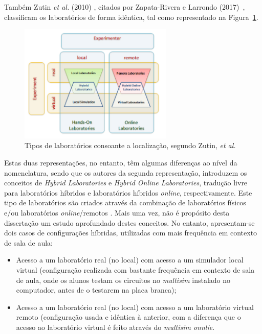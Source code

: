 Também Zutin \textit{et al.} (2010) \cite{zutinlab2go}, citados por Zapata-Rivera e Larrondo (2017)~\cite{Zapata-Rivera}, classificam os laboratórios de forma idêntica, tal como representado na Figura~\ref{fig:classificaçãozutin}.

\begin{figure}[hbtp]
    \centering
    \includegraphics[width=0.65\textwidth]{figures/carac_lab.png}
    \caption{Tipos de laboratórios consoante a localização, segundo Zutin, \textit{et al.} \cite{zutinlab2go}}
    \label{fig:classificaçãozutin}
\end{figure}

Estas duas representações, no entanto, têm algumas diferenças ao nível da nomenclatura, sendo que os autores da segunda representação, introduzem os conceitos de \textit{Hybrid Laboratories} e \textit{Hybrid Online Laboratories}, tradução livre para laboratórios híbridos e laboratórios híbridos \textit{online}, respectivamente. Este tipo de laboratórios são criados através da combinação de laboratórios físicos e/ou laboratórios \textit{online}/remotos \cite{Zapata-Rivera}. Mais uma vez, não é propósito desta dissertação um estudo aprofundado destes conceitos. No entanto, apresentam-se dois casos de configurações híbridas, utilizadas com mais frequência em contexto de sala de aula:

\begin{itemize}
    \item Acesso a um laboratório real (no local) com acesso a um simulador local virtual (configuração realizada com bastante frequência em contexto de sala de aula, onde os alunos testam os circuitos no \textit{multisim} instalado no computador, antes de o testarem na placa branca);
    \item Acesso a um laboratório real (no local) com acesso a um laboratório virtual remoto (configuração usada e idêntica à anterior, com a diferença que o acesso ao laboratório virtual é feito através do \textit{multisim onnlie}.
\end{itemize}

